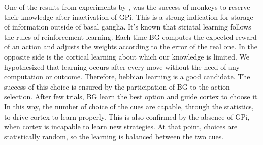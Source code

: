 	One of the results from experiments by \citet{Piron2015}, was the success of monkeys to reserve their knowledge after inactivation of GPi. This is a strong indication for storage of information outside of basal ganglia. It's known that striatal learning follows the rules of reinforcement learning. Each time BG computes the expected reward of an action and adjusts the weights according to the error of the real one. In the opposite side is the cortical learning about which our knowledge is limited. We hypothesized that learning occurs after every move without the need of any computation or outcome. Therefore, hebbian learning is a good candidate. The success of this choice is ensured by the participation of BG to the action selection. After few trials, BG learn the best option and guide cortex to choose it. In this way, the number of choice of the cues are capable, through the statistics, to drive cortex to learn properly. This is also confirmed by the absence of GPi, when cortex is incapable to learn new strategies. At that point, choices are statistically random, so the learning is balanced between the two cues. 